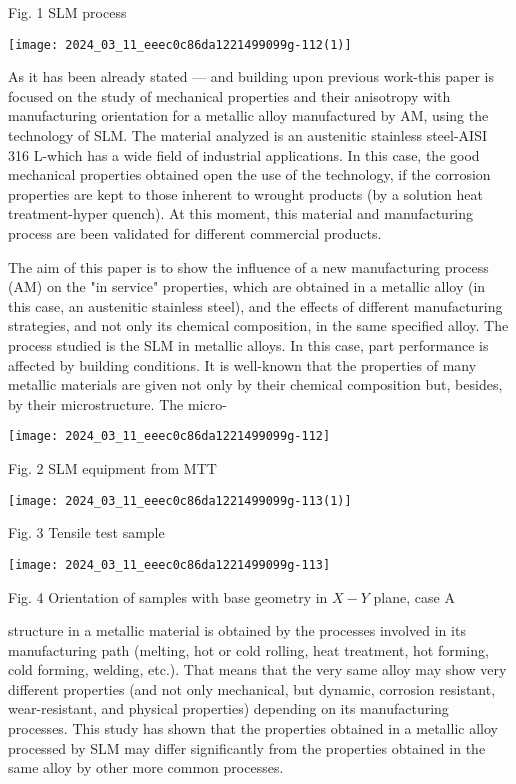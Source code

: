 \documentclass[10pt]{article}
\begin{document}
Fig. 1 SLM process

\begin{center}
\texttt{[image: 2024\_03\_11\_eeec0c86da1221499099g-112(1)]}
\end{center}

As it has been already stated — and building upon previous work-this paper is focused on the study of mechanical properties and their anisotropy with manufacturing orientation for a metallic alloy manufactured by AM, using the technology of SLM. The material analyzed is an austenitic stainless steel-AISI 316 L-which has a wide field of industrial applications. In this case, the good mechanical properties obtained open the use of the technology, if the corrosion properties are kept to those inherent to wrought products (by a solution heat treatment-hyper quench). At this moment, this material and manufacturing process are been validated for different commercial products.

The aim of this paper is to show the influence of a new manufacturing process (AM) on the "in service" properties, which are obtained in a metallic alloy (in this case, an austenitic stainless steel), and the effects of different manufacturing strategies, and not only its chemical composition, in the same specified alloy. The process studied is the SLM in metallic alloys. In this case, part performance is affected by building conditions. It is well-known that the properties of many metallic materials are given not only by their chemical composition but, besides, by their microstructure. The micro-

\begin{center}
\texttt{[image: 2024\_03\_11\_eeec0c86da1221499099g-112]}
\end{center}

Fig. 2 SLM equipment from MTT

\begin{center}
\texttt{[image: 2024\_03\_11\_eeec0c86da1221499099g-113(1)]}
\end{center}

Fig. 3 Tensile test sample

\begin{center}
\texttt{[image: 2024\_03\_11\_eeec0c86da1221499099g-113]}
\end{center}

Fig. 4 Orientation of samples with base geometry in $X-Y$ plane, case A

structure in a metallic material is obtained by the processes involved in its manufacturing path (melting, hot or cold rolling, heat treatment, hot forming, cold forming, welding, etc.). That means that the very same alloy may show very different properties (and not only mechanical, but dynamic, corrosion resistant, wear-resistant, and physical properties) depending on its manufacturing processes. This study has shown that the properties obtained in a metallic alloy processed by SLM may differ significantly from the properties obtained in the same alloy by other more common processes.
\end{document}
